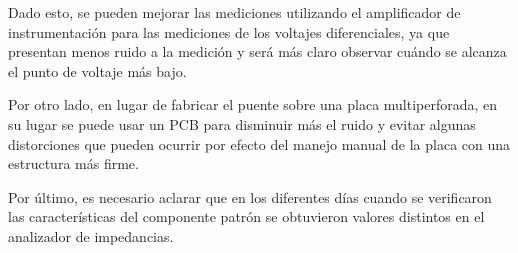     Dado esto, se pueden mejorar las mediciones utilizando el amplificador de instrumentación
    para las mediciones de los voltajes diferenciales, ya que presentan menos ruido a la medición
    y será más claro observar cuándo se alcanza el punto de voltaje más bajo.

    Por otro lado, en lugar de fabricar el puente sobre una placa multiperforada, en su lugar
    se puede usar un PCB para disminuir más el ruido y evitar algunas distorciones que pueden
    ocurrir por efecto del manejo manual de la placa con una estructura más firme.

    Por último, es necesario aclarar que en los diferentes días cuando se verificaron las características
    del componente patrón se obtuvieron valores distintos en el analizador de impedancias.